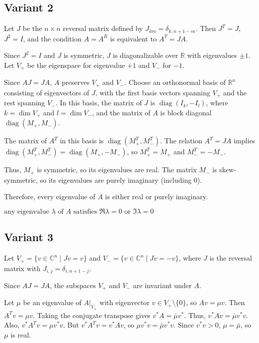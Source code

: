 \documentclass[12pt,a4paper]{article}
\theoremstyle{definition}
\begin{document}
\subsection{Variant 2}
    Let $J$ be the $n \times n$ reversal matrix defined by $J_{k m} = \delta_{k, n+1-m}$. Then $J^T = J$, $J^2 = I$, and the condition $A = A^R$ is equivalent to $A^T = J A$.

    Since $J^2 = I$ and $J$ is symmetric, $J$ is diagonalizable over $\mathbb{R}$ with eigenvalues $\pm 1$. Let $V_+$ be the eigenspace for eigenvalue $+1$ and $V_-$ for $-1$.

    Since $A J = J A$, $A$ preserves $V_+$ and $V_-$. Choose an orthonormal basis of $\mathbb{R}^n$ consisting of eigenvectors of $J$, with the first basis vectors spanning $V_+$ and the rest spanning $V_-$. In this basis, the matrix of $J$ is $\operatorname{diag}(I_k, -I_l)$, where $k = \dim V_+$ and $l = \dim V_-$, and the matrix of $A$ is block diagonal $\operatorname{diag}(M_+, M_-)$.

    The matrix of $A^T$ in this basis is $\operatorname{diag}(M_+^T, M_-^T)$. The relation $A^T = J A$ implies $\operatorname{diag}(M_+^T, M_-^T) = \operatorname{diag}(M_+, -M_-)$, so $M_+^T = M_+$ and $M_-^T = -M_-$.

    Thus, $M_+$ is symmetric, so its eigenvalues are real. The matrix $M_-$ is skew-symmetric, so its eigenvalues are purely imaginary (including 0).

    Therefore, every eigenvalue of $A$ is either real or purely imaginary.

    $\boxed{\text{any eigenvalue } \lambda \text{ of } A \text{ satisfies } \Re\lambda=0 \text{ or } \Im\lambda=0}$
\subsection{Variant 3}
    Let $V_+ = \{ v \in \mathbb{C}^n \mid J v = v \}$ and $V_- = \{ v \in \mathbb{C}^n \mid J v = -v \}$, where $J$ is the reversal matrix with $J_{i,j} = \delta_{i, n+1-j}$.

    Since $A J = J A$, the subspaces $V_+$ and $V_-$ are invariant under $A$.

    Let $\mu$ be an eigenvalue of $A|_{V_+}$ with eigenvector $v \in V_+ \setminus \{0\}$, so $A v = \mu v$. Then $A^T v = \mu v$. Taking the conjugate transpose gives $v^* A = \bar{\mu} v^*$. Thus, $v^* A v = \bar{\mu} v^* v$. Also, $v^* A^T v = \mu v^* v$. But $v^* A^T v = v^* A v$, so $\mu v^* v = \bar{\mu} v^* v$. Since $v^* v > 0$, $\mu = \bar{\mu}$, so $\mu$ is real.
\end{document}
